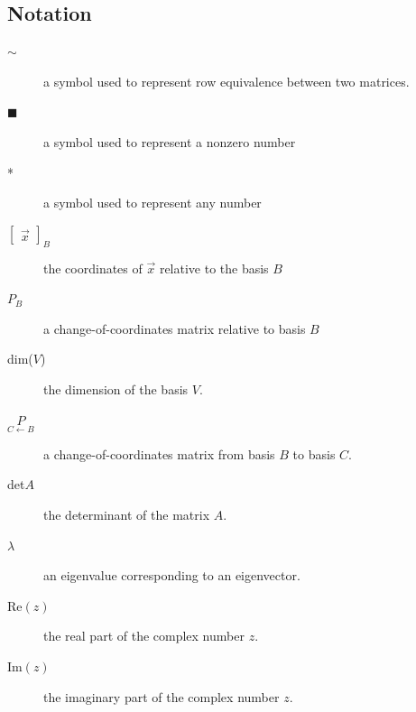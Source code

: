 \documentclass[a4paper,12pt]{article}
\theoremstyle{definition}
\theoremstyle{definition}
\newcommand{\basiscoordvec}[2]{
	\begin{bmatrix}
		\vec{#1}
	\end{bmatrix}_#2
}
\newcommand{\chngbasismat}[2]{
	\underset{#2 \leftarrow #1}{P}
}
\begin{document}
	\subsection{Notation}
	\begin{description}
		\item[$\sim$] a symbol used to represent row equivalence between two matrices.
		
		\item[$\blacksquare$] a symbol used to represent a nonzero number
		
		\item[*] a symbol used to represent any number
		
		\item[$\basiscoordvec{x}{B}$] the coordinates of $\vec{x}$ relative to the basis $B$
		
		\item[$P_B$] a change-of-coordinates matrix relative to basis $B$
		
		\item[dim($V$)] the dimension of the basis $V$.
		
		\item[$\chngbasismat{B}{C}$] a change-of-coordinates matrix from basis $B$ to basis $C$.
		
		\item[det$A$] the determinant of the matrix $A$.
		
		\item[$\lambda$] an eigenvalue corresponding to an eigenvector.
		
		\item[Re$(z)$] the real part of the complex number $z$.
		
		\item[Im$(z)$] the imaginary part of the complex number $z$.
	\end{description}
	
\end{document}
